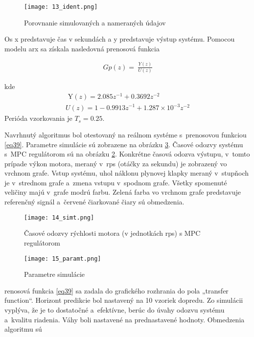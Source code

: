\begin{figure}[!htbp]
\centering
\texttt{[image: 13\_ident.png]}
\caption{Porovnanie simulovaných a nameraných údajov}
\label{13_ident}
\end{figure}
Os x predstavuje čas v sekundách a y predstavuje výstup systému. Pomocou modelu arx sa získala nasledovná prenosová funkcia

\begin{equation} \label{eq38}
\begin{split}
Gp(z) = \ \frac{Y(z)}{U(z)}
\end{split}
\end{equation}

kde
\begin{equation} \label{eq39}
\begin{split}
\text{\ Y}\left( z \right) = 2.085z^{- 1} + 0.3692z^{- 2} \\
U\left( z \right) = 1 - 0.99{13z}^{- 1} + 1.287 \times 10^{- 3}z^{- 2}
\end{split}
\end{equation}
Perióda vzorkovania je \(T_{s} = 0.25\).

Navrhnutý algoritmus bol otestovaný na reálnom systéme s~prenosovou
funkciou \ref{eq39}. Parametre simulácie sú zobrazene na obrázku \ref{15_paramt}. Časové odozvy systému s~MPC regulátorom sú
na obrázku \ref{14_simt}. Konkrétne časová odozva výstupu, v~tomto prípade
výkon motora, meraný v~rps (otáčky za sekundu) je zobrazený vo vrchnom
grafe. Vstup systému, uhol náklonu plynovej klapky meraný v~stupňoch je
v~strednom grafe a~zmena vstupu v~spodnom grafe. Všetky spomenuté
veličiny majú v~grafe modrú farbu. Zelená farba vo vrchnom grafe
predstavuje referenčný signál a~červené čiarkované čiary sú obmedzenia.

\begin{figure}[!htbp]
\centering
\texttt{[image: 14\_simt.png]}
\caption{Časové odozvy rýchlosti motora (v jednotkách rps) s MPC regulátorom}
\label{14_simt}
\end{figure}

\begin{figure}[!htbp]
\centering
\texttt{[image: 15\_paramt.png]}
\caption{Parametre simulácie}
\label{15_paramt}
\end{figure}

renosová funkcia \ref{eq39} sa zadala do grafického rozhrania do pola
„transfer function``. Horizont predikcie bol nastavený na 10 vzoriek
dopredu. Zo simulácii vyplýva, že je to dostatočné a~efektívne, berúc do
úvahy odozvu systému a~kvalitu riadenia. Váhy boli nastavené na
prednastavené hodnoty. Obmedzenia algoritmu sú

